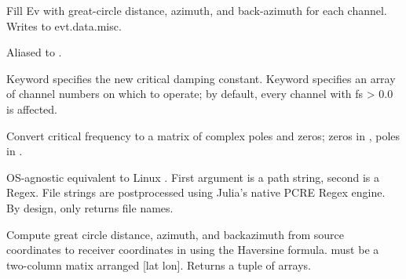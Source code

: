 \documentclass[letterpaper,11pt,english]{sphinxmanual}
\begin{document}
Fill Ev with great-circle distance, azimuth, and back-azimuth for each channel. Writes to evt.data.misc.

\begin{fulllineitems}
\label{\detokenize{src/Appendices/function_list:d2u}}
\end{fulllineitems}


Aliased to .

Keyword  specifies the new critical damping constant. Keyword  specifies an array of channel numbers on which to operate; by default, every channel with fs \textgreater{} 0.0 is affected.

\begin{fulllineitems}
\label{\detokenize{src/Appendices/function_list:fctopz}}
\end{fulllineitems}


Convert critical frequency  to a matrix of complex poles and zeros; zeros in , poles in .

\begin{fulllineitems}
\label{\detokenize{src/Appendices/function_list:find_regex}}
\end{fulllineitems}


OS-agnostic equivalent to Linux . First argument is a path string, second is a Regex. File strings are postprocessed using Julia’s native PCRE Regex engine. By design,  only returns file names.


\begin{fulllineitems}
\end{fulllineitems}


Compute great circle distance, azimuth, and backazimuth from source coordinates  to receiver coordinates in  using the Haversine formula.  must be a two-column matix arranged {[}lat lon{]}. Returns a tuple of arrays.
\end{document}
